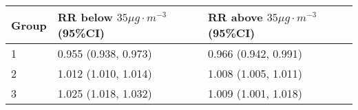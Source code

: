 \begin{tabular}{lll}
  \hline
Group & RR below $35 \mu g \cdot m^{-3}$ (95\%CI) & RR above $35 \mu g \cdot m^{-3}$ (95\%CI) \\ 
  \hline
   1 & 0.955 (0.938, 0.973) & 0.966 (0.942, 0.991) \\ 
     2 & 1.012 (1.010, 1.014) & 1.008 (1.005, 1.011) \\ 
     3 & 1.025 (1.018, 1.032) & 1.009 (1.001, 1.018) \\ 
   \hline
\end{tabular}

